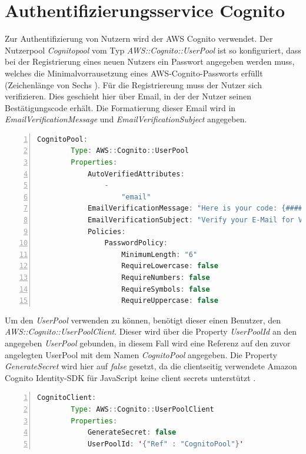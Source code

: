 \documentclass[a4paper, 12pt]{scrreprt}
\renewcommand\_{\textunderscore\allowbreak}
\begin{document}
\section{Authentifizierungsservice Cognito}
Zur Authentifizierung von Nutzern wird der AWS Cognito verwendet. Der Nutzerpool \textit{Cognitopool} vom Typ \textit{AWS::Cognito::UserPool} ist so konfiguriert, dass bei der Registrierung eines neuen Nutzers ein Passwort angegeben werden muss, welches die Minimalvorrausetzung eines AWS-Cognito-Passworts erfüllt (Zeichenlänge von Sechs \cite{AWSD}). Für die Registriereung muss der Nutzer sich verifizieren. Dies geschieht hier über Email, in der der Nutzer seinen Bestätigungscode erhält. Die Formatierung dieser Email wird in \textit{EmailVerificationMessage} und \textit{EmailVerificationSubject} angegeben.  
\begin{lstlisting}[xleftmargin=\parindent,numbers=left,numberstyle=\small,numbersep=8pt,frame=L,mathescape=true, basicstyle=\small, language=Java, lineskip={1.0pt}]
CognitoPool:
        Type: AWS::Cognito::UserPool
        Properties:
            AutoVerifiedAttributes:
                -
                    "email"
            EmailVerificationMessage: "Here is your code: {####}"
            EmailVerificationSubject: "Verify your E-Mail for VD"
            Policies:
                PasswordPolicy:
                    MinimumLength: "6"
                    RequireLowercase: false
                    RequireNumbers: false
                    RequireSymbols: false
                    RequireUppercase: false

\end{lstlisting}
\bigskip
\noindent Um den \textit{UserPool} verwenden zu können, benötigt dieser einen Benutzer, den \textit{AWS::Cognito::UserPoolClient}. Dieser wird über die Property \textit{UserPoolId} an den angegeben \textit{UserPool} gebunden, in diesem Fall wird eine Referenz auf den zuvor angelegten UserPool mit dem Namen \textit{CognitoPool} angegeben. Die Property \textit{GenerateSecret} wird hier auf \textit{false} gesetzt, da die clientseitig verwendete Amazon Cognito Identity-SDK für JavaScript keine client secrets unterstützt \cite{AWSAmplify}.

\begin{lstlisting}[xleftmargin=\parindent,numbers=left,numberstyle=\small,numbersep=8pt,frame=L,mathescape=true, basicstyle=\small, language=Java, lineskip={1.0pt}]
    CognitoClient:
        Type: AWS::Cognito::UserPoolClient
        Properties:
            GenerateSecret: false
            UserPoolId: '{"Ref" : "CognitoPool"}'
\end{lstlisting} 
\end{document}
